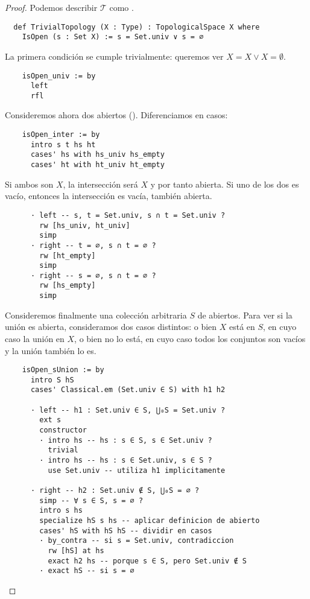 \begin{proof}
  Podemos describir $\mathcal{T}$ como .

  \begin{lstlisting}
  def TrivialTopology (X : Type) : TopologicalSpace X where
    IsOpen (s : Set X) := s = Set.univ ∨ s = ∅ \end{lstlisting}

  La primera condición se cumple trivialmente: queremos ver $X = X \lor X = \emptyset$.

  \begin{lstlisting}
    isOpen_univ := by
      left
      rfl\end{lstlisting}

  Consideremos ahora dos abiertos (). Diferenciamos en casos:

  \begin{lstlisting}
    isOpen_inter := by
      intro s t hs ht
      cases' hs with hs_univ hs_empty
      cases' ht with ht_univ ht_empty \end{lstlisting}

  Si ambos son $X$, la intersección será $X$ y por tanto abierta. Si uno de los dos es vacío, entonces la intersección es vacía, también abierta.

  \begin{lstlisting}
      · left -- s, t = Set.univ, s ∩ t = Set.univ ?
        rw [hs_univ, ht_univ]
        simp
      · right -- t = ∅, s ∩ t = ∅ ?
        rw [ht_empty]
        simp
      · right -- s = ∅, s ∩ t = ∅ ?
        rw [hs_empty]
        simp \end{lstlisting}

  Consideremos finalmente una colección arbitraria $S$ de abiertos. Para ver si la unión es abierta, consideramos dos casos distintos: o bien $X$ está en $S$, en cuyo caso la unión en $X$, o bien no lo está, en cuyo caso todos los conjuntos son vacíos y la unión también lo es.

  \begin{lstlisting}
    isOpen_sUnion := by
      intro S hS
      cases' Classical.em (Set.univ ∈ S) with h1 h2

      · left -- h1 : Set.univ ∈ S, ⋃₀S = Set.univ ?
        ext s
        constructor
        · intro hs -- hs : s ∈ S, s ∈ Set.univ ?
          trivial
        · intro hs -- hs : s ∈ Set.univ, s ∈ S ?
          use Set.univ -- utiliza h1 implicitamente

      · right -- h2 : Set.univ ∉ S, ⋃₀S = ∅ ?
        simp -- ∀ s ∈ S, s = ∅ ?
        intro s hs
        specialize hS s hs -- aplicar definicion de abierto
        cases' hS with hS hS -- dividir en casos
        · by_contra -- si s = Set.univ, contradiccion
          rw [hS] at hs 
          exact h2 hs -- porque s ∈ S, pero Set.univ ∉ S
        · exact hS -- si s = ∅ \end{lstlisting}
\end{proof}


